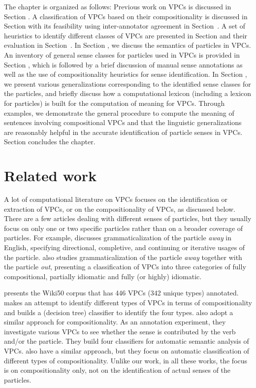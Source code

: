 \documentclass[output=paper
,modfonts
,nonflat]{langsci/langscibook}
\begin{document}
The chapter is organized as follows: Previous work on VPCs is discussed in Section . A classification of VPCs based on their compositionality is discussed in Section  with its feasibility using inter-annotator agreement in Section~. A set of heuristics to identify different classes of VPCs are presented in Section  and their evaluation in Section~. In Section , we discuss the semantics of particles in VPCs. An inventory of general sense classes for particles used in VPCs is provided in Section , which is followed by a brief discussion of manual sense annotations as well as the use of compositionality heuristics for sense identification. In Section , we present various generalizations corresponding to the identified sense classes for the particles, and briefly discuss how a computational lexicon (including a lexicon for particles) is built for the computation of meaning for VPCs. Through examples, we demonstrate the general procedure to compute the meaning of sentences involving compositional VPCs and that the linguistic generalizations are reasonably helpful in the accurate identification of particle senses in VPCs. Section  concludes the chapter.

\section{Related work } \label{sec:prevwork}
A lot of computational literature on VPCs focuses on the identification or extraction of VPCs, or on the compositionality of VPCs, as discussed below. There are a few articles dealing with different senses of particles, but they usually focus on only one or two specific particles rather than on a broader coverage of particles. For example, \citet{Nii14} discusses grammaticalization of the particle \textit{away} in English, specifying directional, completive, and continuing or iterative usages of the particle. \citet{Ish12,Ish10} also studies grammaticalization of the particle \textit{away} together with the particle \textit{out}, presenting a classification of VPCs into three categories of fully compositional, partially idiomatic and fully (or highly) idiomatic. 

\citet{wiki50} presents the Wiki50 corpus that has 446 VPCs (342 unique types) annotated. \citet{Ban02} makes an attempt to identify different types of VPCs in terms of compositionality and builds a (decision tree) classifier to identify the four types. \citet{Ban03} also adopt a similar approach for compositionality. As an annotation experiment, they investigate various VPCs to see whether the sense is contributed by the verb and/or the particle. They build four classifiers for automatic semantic analysis of VPCs. \citet{Pat04} also have a similar approach, but they focus on automatic classification of different types of compositionality. Unlike our work, in all these works, the focus is on compositionality only, not on the identification of actual senses of the particles.
\end{document}
